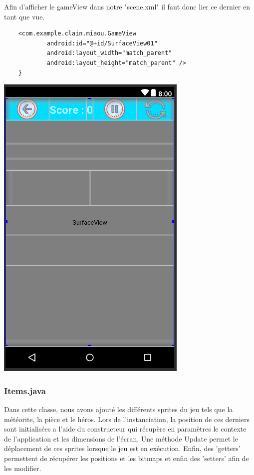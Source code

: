 \documentclass{article}
\begin{document}
\newpage
Afin d'afficher le gameView dans notre "scene.xml" il faut donc lier ce dernier en tant que vue. 
\begin{verbatim}
    <com.example.clain.miaou.GameView
            android:id="@+id/SurfaceView01"
            android:layout_width="match_parent"
            android:layout_height="match_parent" />
    }
\end{verbatim}

\begin{center}
    \includegraphics[scale = 0.7]{images/gameview.PNG}
\end{center}

\subsubsection{Items.java}
Dans cette classe, nous avons ajouté les différents sprites du jeu tels que la météorite, la pièce et le héros. Lors de l'instanciation, la position de ces derniers sont initialisées a l'aide du constructeur qui récupère en paramètres le contexte de l'application et les dimensions de l'écran. Une méthode Update permet le déplacement de ces sprites lorsque le jeu est en exécution. Enfin, des 'getters' permettent de récupérer les positions et les bitmaps et enfin des 'setters' afin de les modifier.
\end{document}
